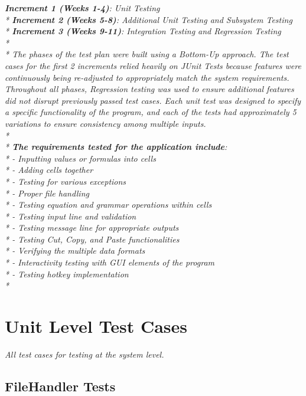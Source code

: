 \documentclass[12pt]{article}
\begin{document}
{\it
\textbf{Increment 1 (Weeks 1-4)}: Unit Testing \\*
\textbf{Increment 2 (Weeks 5-8)}: Additional Unit Testing and Subsystem Testing \\*
\textbf{Increment 3 (Weeks 9-11)}: Integration Testing and Regression Testing  \\*
\\*
The phases of the test plan were built using a Bottom-Up approach. The test cases for the first 2 increments relied heavily on JUnit Tests because features were continuously being re-adjusted to appropriately match the system requirements. Throughout all phases, Regression testing was used to ensure additional features did not disrupt previously passed test cases. Each unit test was designed to specify a specific functionality of the program, and each of the tests had approximately 5 variations to ensure consistency among multiple inputs. 
\\*
\\*
\textbf{The requirements tested for the application include}:\\*
- Inputting values or formulas into cells \\*
- Adding cells together \\*
- Testing for various exceptions \\*
- Proper file handling \\*
- Testing equation and grammar operations within cells \\*
- Testing input line and validation \\*
- Testing message line for appropriate outputs \\*
- Testing Cut, Copy, and Paste functionalities \\*
- Verifying the multiple data formats \\*
- Interactivity testing with GUI elements of the program \\*
- Testing hotkey implementation \\*

}
\section{Unit Level Test Cases}

{\it
All test cases for testing at the system level.
}

\subsection{FileHandler Tests}
\end{document}

